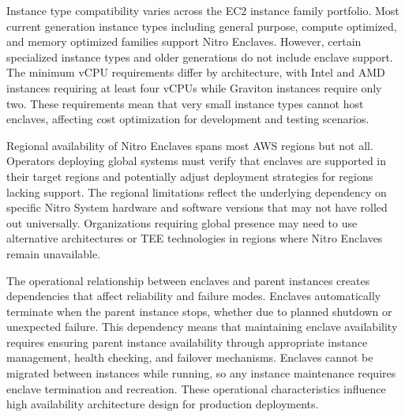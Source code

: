 Instance type compatibility varies across the EC2 instance family portfolio. Most current generation instance types including general purpose, compute optimized, and memory optimized families support Nitro Enclaves. However, certain specialized instance types and older generations do not include enclave support. The minimum vCPU requirements differ by architecture, with Intel and AMD instances requiring at least four vCPUs while Graviton instances require only two. These requirements mean that very small instance types cannot host enclaves, affecting cost optimization for development and testing scenarios.

Regional availability of Nitro Enclaves spans most AWS regions but not all. Operators deploying global systems must verify that enclaves are supported in their target regions and potentially adjust deployment strategies for regions lacking support. The regional limitations reflect the underlying dependency on specific Nitro System hardware and software versions that may not have rolled out universally. Organizations requiring global presence may need to use alternative architectures or TEE technologies in regions where Nitro Enclaves remain unavailable.

The operational relationship between enclaves and parent instances creates dependencies that affect reliability and failure modes. Enclaves automatically terminate when the parent instance stops, whether due to planned shutdown or unexpected failure. This dependency means that maintaining enclave availability requires ensuring parent instance availability through appropriate instance management, health checking, and failover mechanisms. Enclaves cannot be migrated between instances while running, so any instance maintenance requires enclave termination and recreation. These operational characteristics influence high availability architecture design for production deployments.
